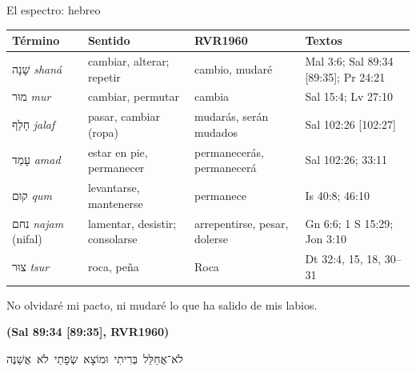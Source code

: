 \documentclass[hyperref={bookmarks=false},aspectratio=169]{beamer}
\newcommand{\heb}[1]{\mbox{\foreignlanguage{hebrew}{#1}}}
\newcommand{\fuente}[1]{\par\hfill{\upshape\bfseries\footnotesize\textcolor{azul}{#1}}}
\begin{document}
\begin{frame}{El espectro: hebreo}
\scriptsize\renewcommand{\arraystretch}{1.12}
\begin{tabular}{@{}>{\RaggedRight\arraybackslash}p{2.7cm}>{\RaggedRight\arraybackslash}p{3.1cm}>{\RaggedRight\arraybackslash}p{2.6cm}>{\RaggedRight\arraybackslash}p{3.3cm}@{}}
\toprule
\textbf{Término} & \textbf{Sentido} & \textbf{RVR1960} & \textbf{Textos} \\ \midrule
\heb{שָׁנָה} \emph{shaná} & cambiar, alterar; repetir & cambio, mudaré & Mal 3:6; Sal 89:34 [89:35]; Pr 24:21 \\
\heb{מוּר} \emph{mur} & cambiar, permutar & cambia & Sal 15:4; Lv 27:10 \\
\heb{חָלַף} \emph{jalaf} & pasar, cambiar (ropa) & mudarás, serán mudados & Sal 102:26 [102:27] \\
\heb{עָמַד} \emph{amad} & estar en pie, permanecer & permanecerás, permanecerá & Sal 102:26; 33:11 \\
\heb{קוּם} \emph{qum} & levantarse, mantenerse & permanece & Is 40:8; 46:10 \\
\heb{נחם} \emph{najam} (nifal) & lamentar, desistir; consolarse & arrepentirse, pesar, dolerse & Gn 6:6; 1 S 15:29; Jon 3:10 \\
\heb{צוּר} \emph{tsur} & roca, peña & Roca & Dt 32:4, 15, 18, 30--31 \\
\bottomrule
\end{tabular}\par\medskip
\begin{cita}No olvidaré mi pacto, ni mudaré lo que ha salido de mis labios.\fuente{(Sal 89:34 [89:35], RVR1960)}\end{cita}
\centering\heb{לֹא־אֲחַלֵּל בְּרִיתִי וּמוֹצָא שְׂפָתַי לֹא אֲשַׁנֶּה}
\end{frame}
\end{document}
